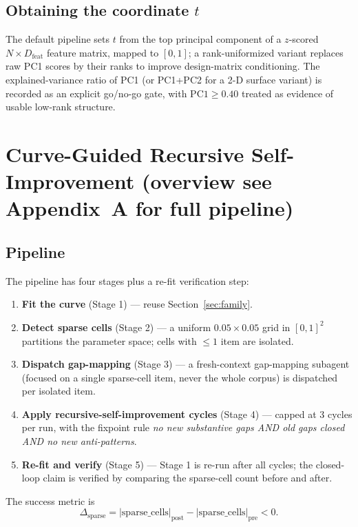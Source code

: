 \documentclass[11pt,a4paper]{article}
\begin{document}
\subsection{Obtaining the coordinate $t$}

The default pipeline sets $t$ from the top principal component of a $z$-scored $N \times D_{\mathrm{feat}}$ feature matrix, mapped to $[0,1]$; a rank-uniformized variant replaces raw PC1 scores by their ranks to improve design-matrix conditioning. The explained-variance ratio of PC1 (or PC1+PC2 for a 2-D surface variant) is recorded as an explicit go/no-go gate, with $\mathrm{PC1} \geq 0.40$ treated as evidence of usable low-rank structure.

\section{Curve-Guided Recursive Self-Improvement (overview \textemdash{} see Appendix~A for full pipeline)}
\label{sec:rsi}

\subsection{Pipeline}

The pipeline has four stages plus a re-fit verification step:
\begin{enumerate}
\item \textbf{Fit the curve} (Stage 1) --- reuse Section~\ref{sec:family}.
\item \textbf{Detect sparse cells} (Stage 2) --- a uniform $0.05 \times 0.05$ grid in $[0,1]^2$ partitions the parameter space; cells with $\leq 1$ item are isolated.
\item \textbf{Dispatch gap-mapping} (Stage 3) --- a fresh-context gap-mapping subagent (focused on a single sparse-cell item, never the whole corpus) is dispatched per isolated item.
\item \textbf{Apply recursive-self-improvement cycles} (Stage 4) --- capped at 3 cycles per run, with the fixpoint rule \emph{no new substantive gaps AND old gaps closed AND no new anti-patterns}.
\item \textbf{Re-fit and verify} (Stage 5) --- Stage 1 is re-run after all cycles; the closed-loop claim is verified by comparing the sparse-cell count before and after.
\end{enumerate}

The success metric is
\begin{equation}
\Delta_{\mathrm{sparse}} = |\mathrm{sparse\_cells}|_{\mathrm{post}} - |\mathrm{sparse\_cells}|_{\mathrm{pre}} < 0.
\label{eq:delta}
\end{equation}
\end{document}
